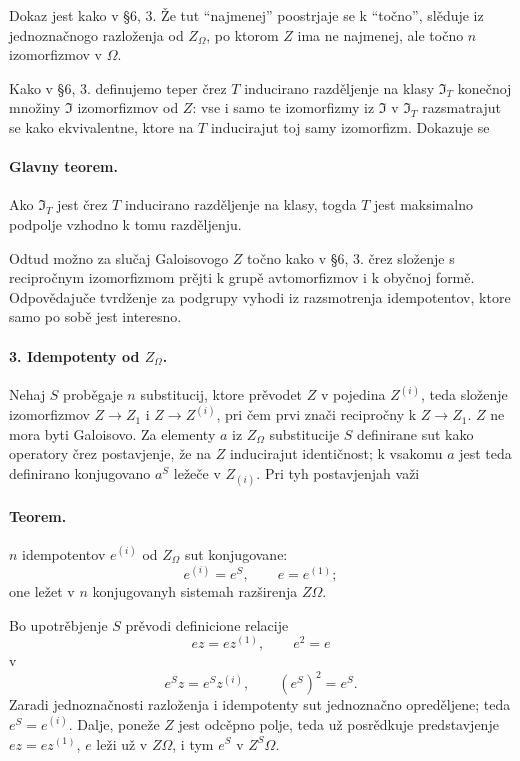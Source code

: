 \documentclass[11pt]{article}
\providecommand{\glqq}{``}
\providecommand{\grqq}{''}
\begin{document}
Dokaz jest kako v §6, 3. Že tut \glqq{}najmenej\grqq{} poostrjaje se k \glqq{}točno\grqq{}, slěduje iz jednoznačnogo razloženja od \(Z_\Omega\), po ktorom \(Z\) ima ne najmenej, ale točno \(n\) izomorfizmov v \(\Omega\).

Kako v §6, 3. definujemo teper črez \(T\) inducirano razděljenje na klasy \(\mathfrak I_T\) konečnoj množiny \(\mathfrak I\) izomorfizmov od \(Z\): vse i samo te izomorfizmy iz \(\mathfrak I\) v \(\mathfrak I_T\) razsmatrajut se kako ekvivalentne, ktore na \(T\) inducirajut toj samy izomorfizm. Dokazuje se

\paragraph{Glavny teorem.}
Ako \(\mathfrak I_T\) jest črez \(T\) inducirano razděljenje na klasy, togda \(T\) jest maksimalno podpolje vzhodno k tomu razděljenju.

Odtud možno za slučaj Galoisovogo \(Z\) točno kako v §6, 3. črez složenje s recipročnym izomorfizmom prějti k grupě avtomorfizmov i k obyčnoj formě. Odpovědajuče tvrdženje za podgrupy vyhodi iz razsmotrenja idempotentov, ktore samo po sobě jest interesno.

\paragraph{3. Idempotenty od \(Z_\Omega\).}
Nehaj \(S\) proběgaje \(n\) substitucij, ktore prěvodet \(Z\) v pojedina \(Z^{(i)}\), teda složenje izomorfizmov \(Z\to Z_1\) i \(Z\to Z^{(i)}\), pri čem prvi znači recipročny k \(Z\to Z_1\). \(Z\) ne mora byti Galoisovo. Za elementy \(a\) iz \(Z_\Omega\) substitucije \(S\) definirane sut kako operatory črez postavjenje, že na \(Z\) inducirajut identičnost; k vsakomu \(a\) jest teda definirano konjugovano \(a^S\) ležeče v \(Z_{(i)}\). Pri tyh postavjenjah važi

\paragraph{Teorem.}
\(n\) idempotentov \(e^{(i)}\) od \(Z_\Omega\) sut konjugovane:
\[
        e^{(i)}=e^S,\qquad e=e^{(1)};
\]
one ležet v \(n\) konjugovanyh sistemah razširenja \(Z\Omega\).

Bo upotrěbjenje \(S\) prěvodi definicione relacije
\[
        ez=ez^{(1)},\qquad e^2=e
\]
v
\[
        e^S z=e^S z^{(i)},\qquad (e^S)^2=e^S .
\]
Zaradi jednoznačnosti razloženja i idempotenty sut jednoznačno opreděljene; teda \(e^S=e^{(i)}\). Dalje, poneže \(Z\) jest odcěpno polje, teda už posrědkuje predstavjenje \(ez=ez^{(1)}\), \(e\) leži už v \(Z\Omega\), i tym \(e^S\) v \(Z^S\Omega\).
\end{document}
